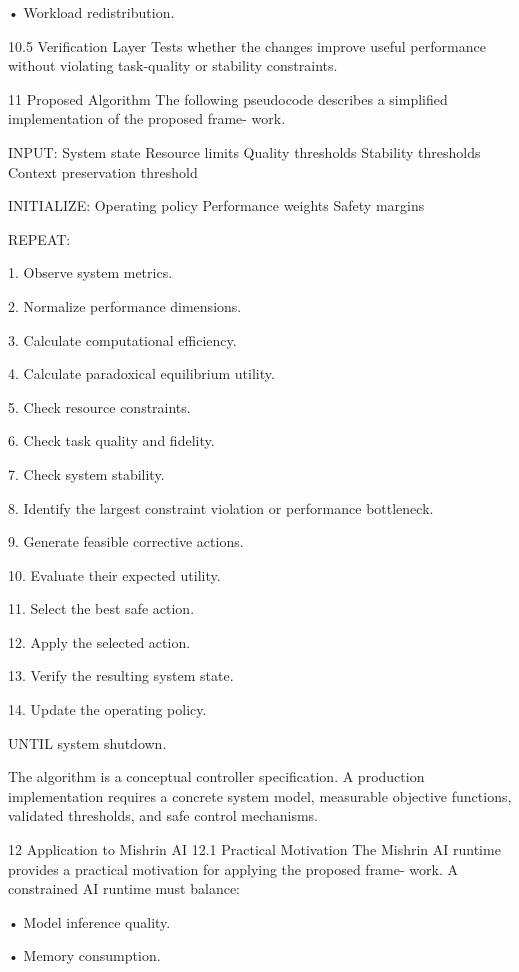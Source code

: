 \documentclass[10pt,a4paper]{article}
\begin{document}
\begin{ManuscriptText}
  • Workload redistribution.


10.5      Verification Layer
Tests whether the changes improve useful performance without violating task-quality or
stability constraints.


11     Proposed Algorithm
The following pseudocode describes a simplified implementation of the proposed frame-
work.

INPUT:
    System state
    Resource limits
    Quality thresholds
    Stability thresholds
    Context preservation threshold

INITIALIZE:
    Operating policy
    Performance weights
    Safety margins

REPEAT:

     1. Observe system metrics.

     2. Normalize performance dimensions.

     3. Calculate computational efficiency.

     4. Calculate paradoxical equilibrium utility.

     5. Check resource constraints.

     6. Check task quality and fidelity.


     7. Check system stability.

     8. Identify the largest constraint violation
        or performance bottleneck.

     9. Generate feasible corrective actions.

   10. Evaluate their expected utility.

   11. Select the best safe action.

   12. Apply the selected action.

   13. Verify the resulting system state.

   14. Update the operating policy.

UNTIL system shutdown.

   The algorithm is a conceptual controller specification. A production implementation
requires a concrete system model, measurable objective functions, validated thresholds,
and safe control mechanisms.


12     Application to Mishrin AI
12.1    Practical Motivation
The Mishrin AI runtime provides a practical motivation for applying the proposed frame-
work.
   A constrained AI runtime must balance:

  • Model inference quality.

  • Memory consumption.


\end{ManuscriptText}
\end{document}
